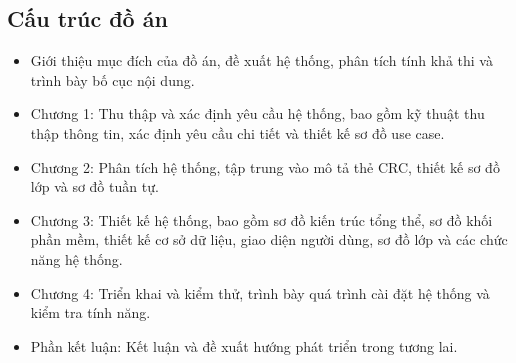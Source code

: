 \subsection*{Cấu trúc đồ án}

\begin{adjustwidth}{1.5em}{}
\begin{itemize}
  \item Giới thiệu mục đích của đồ án, đề xuất hệ thống, phân tích tính khả thi và trình bày bố cục nội dung.
  \item Chương 1: Thu thập và xác định yêu cầu hệ thống, bao gồm kỹ thuật thu thập thông tin, xác định yêu cầu chi tiết và thiết kế sơ đồ use case.
  \item Chương 2: Phân tích hệ thống, tập trung vào mô tả thẻ CRC, thiết kế sơ đồ lớp và sơ đồ tuần tự.
  \item Chương 3: Thiết kế hệ thống, bao gồm sơ đồ kiến trúc tổng thể, sơ đồ khối phần mềm, thiết kế cơ sở dữ liệu, giao diện người dùng, sơ đồ lớp và các chức năng hệ thống.
  \item Chương 4: Triển khai và kiểm thử, trình bày quá trình cài đặt hệ thống và kiểm tra tính năng.
  \item Phần kết luận: Kết luận và đề xuất hướng phát triển trong tương lai.
\end{itemize}
\end{adjustwidth}

\cleardoublepage

